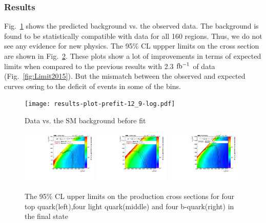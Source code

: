 \subsubsection{Results}
Fig.~\ref{fig:Datavsbkg2016} shows the predicted background vs. the observed data. The background is found to be statistically compatible with data for all 160 regions. Thus, we do not see any evidence for new physics. The  95\% CL uppper limits on the cross section are shown in Fig.~\ref{fig:Limit2016}. These plots show a lot of improvements in terms of expected limits when compared to the previous results with 2.3 $\rm fb^{-1}$ of data (Fig.~\ref{fig:Limit2015}). But the mismatch between the observed and expected curves owing to the deficit of events in some of the bins.   
\begin{figure}
\centering
\texttt{[image: results-plot-prefit-12\_9-log.pdf]}
\caption{\label{fig:Datavsbkg2016} Data vs. the SM background before fit}
\end{figure}
\begin{figure}[h]
\centering
\includegraphics[width=0.32\textwidth]{T1tttt_12p9_limit.pdf}
\includegraphics[width=0.32\textwidth]{T1qqqq_12p9_limit.pdf}
\includegraphics[width=0.32\textwidth]{T1bbbb_12p9_limit.pdf}
\caption{\label{fig:Limit2016}The 95\% CL upper limits on the production cross sections for four top quark(left),four light quark(middle) and four b-quark(right) in the final state}
\end{figure}





